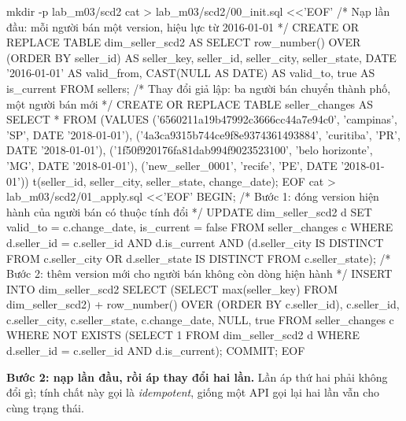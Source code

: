\begin{codeblock}
mkdir -p lab_m03/scd2
cat > lab_m03/scd2/00_init.sql <<'EOF'
/* Nạp lần đầu: mỗi người bán một version, hiệu lực từ 2016-01-01 */
CREATE OR REPLACE TABLE dim_seller_scd2 AS
SELECT row_number() OVER (ORDER BY seller_id) AS seller_key,
       seller_id, seller_city, seller_state,
       DATE '2016-01-01' AS valid_from, CAST(NULL AS DATE) AS valid_to,
       true AS is_current
FROM sellers;
/* Thay đổi giả lập: ba người bán chuyển thành phố, một người bán mới */
CREATE OR REPLACE TABLE seller_changes AS
SELECT * FROM (VALUES
  ('6560211a19b47992c3666cc44a7e94c0', 'campinas',       'SP', DATE '2018-01-01'),
  ('4a3ca9315b744ce9f8e9374361493884', 'curitiba',       'PR', DATE '2018-01-01'),
  ('1f50f920176fa81dab994f9023523100', 'belo horizonte', 'MG', DATE '2018-01-01'),
  ('new_seller_0001',                  'recife',         'PE', DATE '2018-01-01'))
  t(seller_id, seller_city, seller_state, change_date);
EOF
cat > lab_m03/scd2/01_apply.sql <<'EOF'
BEGIN;
/* Bước 1: đóng version hiện hành của người bán có thuộc tính đổi */
UPDATE dim_seller_scd2 d
SET valid_to = c.change_date, is_current = false
FROM seller_changes c
WHERE d.seller_id = c.seller_id AND d.is_current
  AND (d.seller_city IS DISTINCT FROM c.seller_city
       OR d.seller_state IS DISTINCT FROM c.seller_state);
/* Bước 2: thêm version mới cho người bán không còn dòng hiện hành */
INSERT INTO dim_seller_scd2
SELECT (SELECT max(seller_key) FROM dim_seller_scd2)
         + row_number() OVER (ORDER BY c.seller_id),
       c.seller_id, c.seller_city, c.seller_state,
       c.change_date, NULL, true
FROM seller_changes c
WHERE NOT EXISTS (SELECT 1 FROM dim_seller_scd2 d
                  WHERE d.seller_id = c.seller_id AND d.is_current);
COMMIT;
EOF
\end{codeblock}

\textbf{Bước 2: nạp lần đầu, rồi áp thay đổi hai lần.} Lần áp thứ hai phải không đổi gì; tính chất này gọi là \textit{idempotent}, giống một API  gọi lại hai lần vẫn cho cùng trạng thái.


